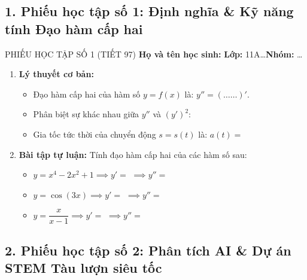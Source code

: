 \documentclass[12pt, a4paper]{article}
\begin{document}
\subsection*{1. Phiếu học tập số 1: Định nghĩa & Kỹ năng tính Đạo hàm cấp hai}

\begin{pedabox}{PHIẾU HỌC TẬP SỐ 1 (TIẾT 97)}
\textbf{Họ và tên học sinh:} \dotfill \textbf{Lớp:} 11A\dots \quad \textbf{Nhóm:} \dots
\begin{enumerate}[leftmargin=0.6cm]
    \item \textbf{Lý thuyết cơ bản:}
    \begin{itemize}
        \item Đạo hàm cấp hai của hàm số $y = f(x)$ là: $y'' = (\dots\dots)'$.
        \item Phân biệt sự khác nhau giữa $y''$ và $(y')^2$: \dotfill
        \item Gia tốc tức thời của chuyển động $s = s(t)$ là: $a(t) = $ \dotfill
    \end{itemize}

    \item \textbf{Bài tập tự luận:}
    Tính đạo hàm cấp hai của các hàm số sau:
    \begin{itemize}
        \item $y = x^4 - 2x^2 + 1 \implies y' = $ \dotfill $\implies y'' = $ \dotfill
        \item $y = \cos(3x) \implies y' = $ \dotfill $\implies y'' = $ \dotfill
        \item $y = \dfrac{x}{x - 1} \implies y' = $ \dotfill $\implies y'' = $ \dotfill
    \end{itemize}
\end{enumerate}
\end{pedabox}

\subsection*{2. Phiếu học tập số 2: Phân tích AI & Dự án STEM Tàu lượn siêu tốc}
\end{document}
